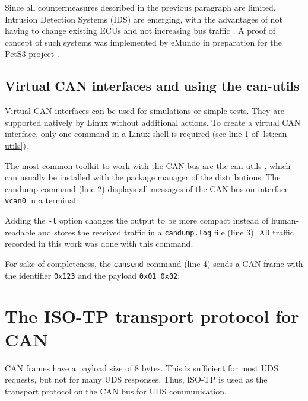 Since all countermeasures described in the previous paragraph are limited, Intrusion Detection Systems (IDS) are emerging, with the advantages of not having to change existing ECUs and not increasing bus traffic \cite{Bozdal2020}. A proof of concept of such systems was implemented by eMundo in preparation for the PetS3 project \cite{spahn2018}.

\subsection{Virtual CAN interfaces and using the can-utils}
\label{subsubsec:can-utils}

Virtual CAN interfaces can be used for simulations or simple tests. They are supported natively by Linux without additional actions.
To create a virtual CAN interface, only one command in a Linux shell is required (see line 1 of \autoref{lst:can-utils}).


The most common toolkit to work with the CAN bus are the can-utils \cite{can-utils}, which can usually be installed with the package manager of the distributions. The candump command (line 2) displays all messages of the CAN bus on interface \texttt{vcan0} in a terminal:

Adding the \texttt{-l} option changes the output to be more compact instead of human-readable and stores the received traffic in a \texttt{candump.log} file (line 3). All traffic recorded in this work was done with this command.

For sake of completeness, the \texttt{cansend} command (line 4) sends a CAN frame with the identifier \texttt{0x123} and the payload \texttt{0x01 0x02}:

\section{The ISO-TP transport protocol for CAN}

CAN frames have a payload size of 8 bytes. This is sufficient for most UDS requests, but not for many UDS responses. Thus, ISO-TP is used as the transport protocol on the CAN bus for UDS communication.

